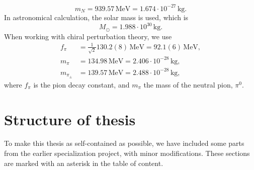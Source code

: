 %
\begin{equation}
    \label{mass of neutron}
    m_N = 939.57 \, \text{MeV} = 1.674\cdot 10^{-27} \, \text{kg}.
\end{equation}
%
In astronomical calculation, the solar mass is used, which is
%
\begin{equation}
    \label{solar mass}
    M_\odot = 1.988 \cdot 10^{30} \, \text{kg}.
\end{equation}
%
When working with chiral perturbation theory, we use
%
\begin{align}
    \label{pion decay constant}
    f_\pi & = \frac{1}{\sqrt{2}}130.2 (8) \, \text{MeV} = 92.1(6) \, \text{MeV}, \\
    \label{pion mass}
    m_\pi & = 134.98 \, \text{MeV} = 2.406 \cdot 10^{-28} \, \text{kg}, \\
    \label{charged pion mass}
    m_{\pi_\pm} &= 139.57 \, \text{MeV} = 2.488 \cdot 10^{-28}\, \text{kg},
\end{align}
%
where $f_\pi$ is the pion decay constant, and $m_\pi$ the mass of the neutral pion, $\pi^0$.

\section{Structure of thesis}

To make this thesis as self-contained as possible, we have included some parts from the earlier specialization project, with minor modifications.
These sections are marked with an asterisk in the table of content.
